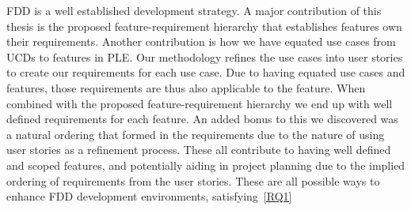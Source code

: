 
\ac{FDD} is a well established development strategy. A major contribution of this thesis is the proposed feature-requirement hierarchy that establishes features own their requirements. Another contribution is how we have equated use cases from \ac{UCD}s to features in \ac{PLE}. Our methodology refines the use cases into user stories to create our requirements for each use case. Due to having equated use cases and features, those requirements are thus also applicable to the feature. When combined with the proposed feature-requirement hierarchy we end up with well defined requirements for each feature. An added bonus to this we discovered was a natural ordering that formed in the requirements due to the nature of using user stories as a refinement process. These all contribute to having well defined and scoped features, and potentially aiding in project planning due to the implied ordering of requirements from the user stories. These are all possible ways to enhance \ac{FDD} development environments, satisfying~\ref{RQ1}





